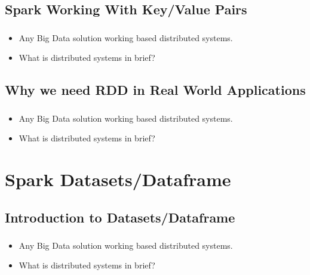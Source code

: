 \subsection{Spark Working With Key/Value Pairs}

\begin{frame}
  \frametitle{\subsecname}
	\begin{itemize}[<+->]
		\item Any Big Data solution working based distributed systems.
		\item What is distributed systems in brief?
	\end{itemize}
\end{frame}


\subsection{Why we need RDD in Real World Applications}

\begin{frame}
  \frametitle{\subsecname}
	\begin{itemize}[<+->]
		\item Any Big Data solution working based distributed systems.
		\item What is distributed systems in brief?
	\end{itemize}
\end{frame}


\section{Spark Datasets/Dataframe}

\subsection{Introduction to Datasets/Dataframe}

\begin{frame}
  \frametitle{\subsecname}
	\begin{itemize}[<+->]
		\item Any Big Data solution working based distributed systems.
		\item What is distributed systems in brief?
	\end{itemize}
\end{frame}


